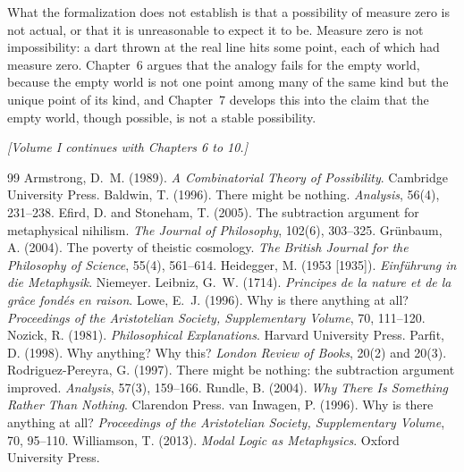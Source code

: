 \documentclass{situationist-preprint}
\begin{document}
What the formalization does not establish is that a possibility of measure zero is not actual, or that it is unreasonable to expect it to be. Measure zero is not impossibility: a dart thrown at the real line hits some point, each of which had measure zero. Chapter~6 argues that the analogy fails for the empty world, because the empty world is not one point among many of the same kind but the unique point of its kind, and Chapter~7 develops this into the claim that the empty world, though possible, is not a stable possibility.

\bigskip
\begin{center}\small\itshape [Volume I continues with Chapters 6 to 10.]\end{center}

\begin{thebibliography}{99}\small
{} Armstrong, D.~M. (1989). \emph{A Combinatorial Theory of Possibility}. Cambridge University Press.
 Baldwin, T. (1996). There might be nothing. \emph{Analysis}, 56(4), 231--238.
 Efird, D. and Stoneham, T. (2005). The subtraction argument for metaphysical nihilism. \emph{The Journal of Philosophy}, 102(6), 303--325.
 Grünbaum, A. (2004). The poverty of theistic cosmology. \emph{The British Journal for the Philosophy of Science}, 55(4), 561--614.
 Heidegger, M. (1953 [1935]). \emph{Einführung in die Metaphysik}. Niemeyer.
 Leibniz, G.~W. (1714). \emph{Principes de la nature et de la grâce fondés en raison}.
 Lowe, E.~J. (1996). Why is there anything at all? \emph{Proceedings of the Aristotelian Society, Supplementary Volume}, 70, 111--120.
 Nozick, R. (1981). \emph{Philosophical Explanations}. Harvard University Press.
 Parfit, D. (1998). Why anything? Why this? \emph{London Review of Books}, 20(2) and 20(3).
 Rodriguez-Pereyra, G. (1997). There might be nothing: the subtraction argument improved. \emph{Analysis}, 57(3), 159--166.
 Rundle, B. (2004). \emph{Why There Is Something Rather Than Nothing}. Clarendon Press.
 van Inwagen, P. (1996). Why is there anything at all? \emph{Proceedings of the Aristotelian Society, Supplementary Volume}, 70, 95--110.
 Williamson, T. (2013). \emph{Modal Logic as Metaphysics}. Oxford University Press.
\end{thebibliography}
\end{document}
